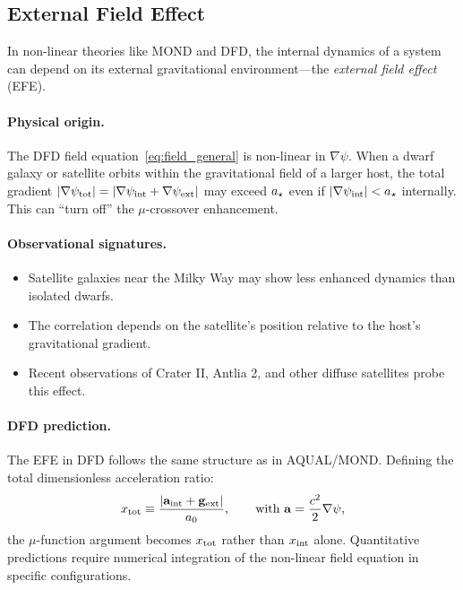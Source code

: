 \subsection{External Field Effect}\label{sec:galactic-efe}

In non-linear theories like MOND and DFD, the internal dynamics of a system can depend on its external gravitational environment---the \textit{external field effect} (EFE).

\paragraph{Physical origin.}
The DFD field equation~\eqref{eq:field_general} is non-linear in $\nabla\psi$. When a dwarf galaxy or satellite orbits within the gravitational field of a larger host, the total gradient $|\nabla\psi_{\rm tot}| = |\nabla\psi_{\rm int} + \nabla\psi_{\rm ext}|$ may exceed $a_\star$ even if $|\nabla\psi_{\rm int}| < a_\star$ internally. This can ``turn off'' the $\mu$-crossover enhancement.

\paragraph{Observational signatures.}
\begin{itemize}
\item Satellite galaxies near the Milky Way may show less enhanced dynamics than isolated dwarfs.
\item The correlation depends on the satellite's position relative to the host's gravitational gradient.
\item Recent observations of Crater II, Antlia 2, and other diffuse satellites probe this effect.
\end{itemize}

\paragraph{DFD prediction.}
The EFE in DFD follows the same structure as in AQUAL/MOND. Defining the total dimensionless acceleration ratio:
\begin{equation}
x_{\rm tot} \equiv \frac{|\mathbf{a}_{\rm int} + \mathbf{g}_{\rm ext}|}{a_0}, \qquad \text{with } \mathbf{a} = \frac{c^2}{2}\nabla\psi,
\end{equation}
the $\mu$-function argument becomes $x_{\rm tot}$ rather than $x_{\rm int}$ alone. Quantitative predictions require numerical integration of the non-linear field equation in specific configurations.


